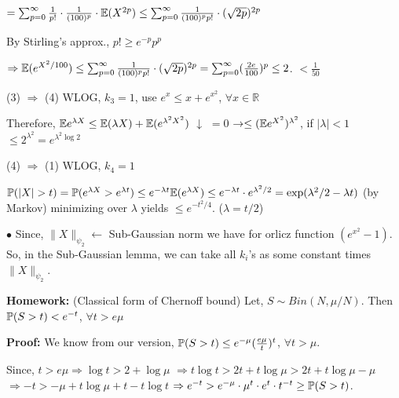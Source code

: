 \documentclass[12pt]{article}
\begin{document}
$= \sum_{p=0}^{\infty} \frac{1}{p!} \cdot \frac{1}{(100)^p} \cdot \mathbb{E}(X^{2p}) \leq \sum_{p=0}^{\infty} \frac{1}{(100)^p p!} \cdot (\sqrt{2p})^{2p}$

By Stirling's approx., $p! \geq e^{-p} p^p$

$\Rightarrow \mathbb{E}(e^{X^2/100}) \leq \sum_{p=0}^{\infty} \frac{1}{(100)^p p!} \cdot (\sqrt{2p})^{2p} = \sum_{p=0}^{\infty} (\frac{2e}{100})^p \leq 2$.
\hspace*{8cm} $< \frac{1}{50}$

(3) $\Rightarrow$ (4) WLOG, $k_3 = 1$, use $e^x \leq x + e^{x^2}$, $\forall x \in \mathbb{R}$

Therefore, $\mathbb{E} e^{\lambda X} \leq \mathbb{E}(\lambda X) + \mathbb{E}(e^{\lambda^2 X^2})$
\hspace*{4cm} $\downarrow$ \hspace*{1cm} $= 0$
\hspace*{4cm} $\to \leq (\mathbb{E} e^{X^2})^{\lambda^2}$, if $|\lambda| < 1$
\hspace*{4cm} $\leq 2^{\lambda^2} = e^{\lambda^2 \log 2}$

(4) $\Rightarrow$ (1) WLOG, $k_4 = 1$

$\mathbb{P}(|X| > t) = \mathbb{P}(e^{\lambda X} > e^{\lambda t}) \leq e^{-\lambda t} \mathbb{E}(e^{\lambda X}) \leq e^{-\lambda t} \cdot e^{\lambda^2/2} = \exp(\lambda^2/2 - \lambda t)$
\hspace*{8cm} (by Markov)
\hspace*{7cm} minimizing over $\lambda$ yields $\leq e^{-t^2/4}$.
\hspace*{8cm} ($\lambda = t/2$)

$\bullet$ Since, $\|X\|_{\psi_2} \leftarrow$ Sub-Gaussian norm we have
for orlicz function $(e^{x^2} - 1)$. So, in the Sub-Gaussian lemma, we can take
all $k_i$'s as some constant times $\|X\|_{\psi_2}$.

\textbf{Homework:}
(Classical form of Chernoff bound) Let, $S \sim Bin(N, \mu/N)$. Then $\mathbb{P}(S > t) < e^{-t}$, $\forall t > e\mu$

\textbf{Proof:} We know from our version, $\mathbb{P}(S > t) \leq e^{-\mu} (\frac{e\mu}{t})^t$, $\forall t > \mu$.

Since, $t > e\mu \Rightarrow \log t > 2 + \log \mu$
\hspace*{3cm} $\Rightarrow t \log t > 2t + t \log \mu > 2t + t \log \mu - \mu$
\hspace*{3cm} $\Rightarrow -t > -\mu + t \log \mu + t - t \log t$
\hspace*{3cm} $\Rightarrow e^{-t} > e^{-\mu} \cdot \mu^t \cdot e^t \cdot t^{-t} \geq \mathbb{P}(S > t)$.
\end{document}
